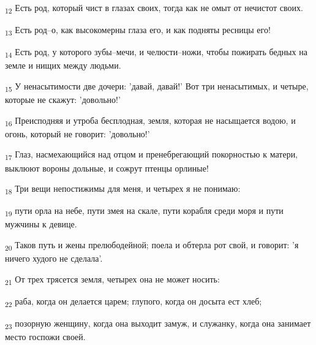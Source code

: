 \begin{tcolorbox}
\textsubscript{12} Есть род, который чист в глазах своих, тогда как не омыт от нечистот своих.
\end{tcolorbox}
\begin{tcolorbox}
\textsubscript{13} Есть род--о, как высокомерны глаза его, и как подняты ресницы его!
\end{tcolorbox}
\begin{tcolorbox}
\textsubscript{14} Есть род, у которого зубы--мечи, и челюсти--ножи, чтобы пожирать бедных на земле и нищих между людьми.
\end{tcolorbox}
\begin{tcolorbox}
\textsubscript{15} У ненасытимости две дочери: 'давай, давай!' Вот три ненасытимых, и четыре, которые не скажут: 'довольно!'
\end{tcolorbox}
\begin{tcolorbox}
\textsubscript{16} Преисподняя и утроба бесплодная, земля, которая не насыщается водою, и огонь, который не говорит: 'довольно!'
\end{tcolorbox}
\begin{tcolorbox}
\textsubscript{17} Глаз, насмехающийся над отцом и пренебрегающий покорностью к матери, выклюют вороны дольные, и сожрут птенцы орлиные!
\end{tcolorbox}
\begin{tcolorbox}
\textsubscript{18} Три вещи непостижимы для меня, и четырех я не понимаю:
\end{tcolorbox}
\begin{tcolorbox}
\textsubscript{19} пути орла на небе, пути змея на скале, пути корабля среди моря и пути мужчины к девице.
\end{tcolorbox}
\begin{tcolorbox}
\textsubscript{20} Таков путь и жены прелюбодейной; поела и обтерла рот свой, и говорит: 'я ничего худого не сделала'.
\end{tcolorbox}
\begin{tcolorbox}
\textsubscript{21} От трех трясется земля, четырех она не может носить:
\end{tcolorbox}
\begin{tcolorbox}
\textsubscript{22} раба, когда он делается царем; глупого, когда он досыта ест хлеб;
\end{tcolorbox}
\begin{tcolorbox}
\textsubscript{23} позорную женщину, когда она выходит замуж, и служанку, когда она занимает место госпожи своей.
\end{tcolorbox}
